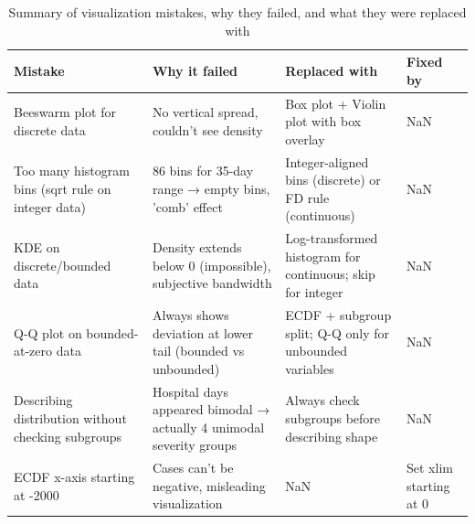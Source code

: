 \begin{table}[htbp]
\caption{Summary of visualization mistakes, why they failed, and what they were replaced with}
\label{tab:mistakes}
\begin{tabular}{llll}
\toprule
Mistake & Why it failed & Replaced with & Fixed by \\
\midrule
Beeswarm plot for discrete data & No vertical spread, couldn't see density & Box plot + Violin plot with box overlay & NaN \\
Too many histogram bins (sqrt rule on integer data) & 86 bins for 35-day range → empty bins, 'comb' effect & Integer-aligned bins (discrete) or FD rule (continuous) & NaN \\
KDE on discrete/bounded data & Density extends below 0 (impossible), subjective bandwidth & Log-transformed histogram for continuous; skip for integer & NaN \\
Q-Q plot on bounded-at-zero data & Always shows deviation at lower tail (bounded vs unbounded) & ECDF + subgroup split; Q-Q only for unbounded variables & NaN \\
Describing distribution without checking subgroups & Hospital days appeared bimodal → actually 4 unimodal severity groups & Always check subgroups before describing shape & NaN \\
ECDF x-axis starting at -2000 & Cases can't be negative, misleading visualization & NaN & Set xlim starting at 0 \\
\bottomrule
\end{tabular}
\end{table}
